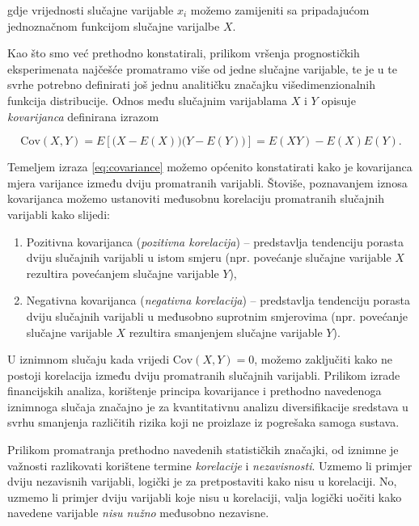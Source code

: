 \documentclass[a4paper,12pt,oneside]{memoir}
\begin{document}
                gdje vrijednosti slučajne varijable $x_i$ možemo zamijeniti sa pripadajućom jednoznačnom funkcijom slučajne varijalbe $X$.

                Kao što smo već prethodno konstatirali, prilikom vršenja prognostičkih eksperimenata najčešće promatramo više od jedne slučajne varijable, te je u te svrhe potrebno definirati još jednu analitičku značajku višedimenzionalnih funkcija distribucije. Odnos među slučajnim varijablama $X$ i $Y$ opisuje \textit{kovarijanca} \cite{Bahovec} definirana izrazom

                \begin{equation}
                    \mathrm{Cov}(X,Y)=E\left[\big(X-E(X)\big)\big(Y-E(Y)\big)\right]=E(XY)-E(X)E(Y).
                    \label{eq:covariance}
                \end{equation}

                Temeljem izraza \eqref{eq:covariance} možemo općenito konstatirati kako je kovarijanca mjera varijance između dviju promatranih varijabli. Štoviše, poznavanjem iznosa kovarijanca možemo ustanoviti međusobnu korelaciju promatranih slučajnih varijabli kako slijedi:

                \begin{enumerate}
                    \item Pozitivna kovarijanca (\textit{pozitivna korelacija}) -- predstavlja tendenciju porasta dviju slučajnih varijabli u istom smjeru (npr. povećanje slučajne varijable $X$ rezultira povećanjem slučajne varijable $Y$),
                    \item Negativna kovarijanca (\textit{negativna korelacija}) -- predstavlja tendenciju porasta dviju slučajnih varijabli u međusobno suprotnim smjerovima (npr. povećanje slučajne varijable $X$ rezultira smanjenjem slučajne varijable $Y$).
                \end{enumerate}

                U iznimnom slučaju kada vrijedi $\mathrm{Cov}(X,Y)=0$, možemo zaključiti kako ne postoji korelacija između dviju promatranih slučajnih varijabli. Prilikom izrade financijskih analiza, korištenje principa kovarijance i prethodno navedenoga iznimnoga slučaja značajno je za kvantitativnu analizu diversifikacije sredstava u svrhu smanjenja različitih rizika koji ne proizlaze iz pogrešaka samoga sustava.
                
                Prilikom promatranja prethodno navedenih statističkih značajki, od iznimne je važnosti razlikovati korištene termine \textit{korelacije} i \textit{nezavisnosti}. Uzmemo li primjer dviju nezavisnih varijabli, logički je za pretpostaviti kako nisu u korelaciji. No, uzmemo li primjer dviju varijabli koje nisu u korelaciji, valja logički uočiti kako navedene varijable \textit{nisu nužno} međusobno nezavisne.
\end{document}
